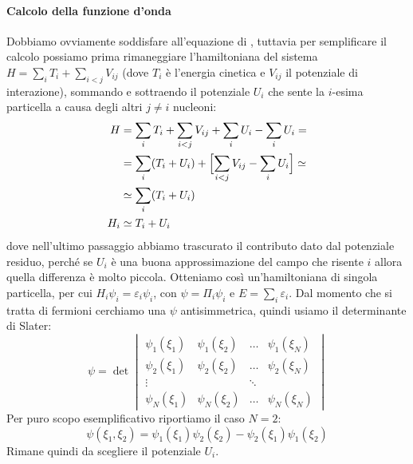 \paragraph{Calcolo della funzione d'onda} Dobbiamo ovviamente soddisfare all'equazione di \Sch, tuttavia per semplificare il calcolo possiamo prima rimaneggiare l'hamiltoniana del sistema $H=\sum_i T_i + \sum_{i<j}V_{ij}$ (dove $T_i$ è l'energia cinetica e $V_{ij}$ il potenziale di interazione), sommando e sottraendo il potenziale $U_i$ che sente la $i$-esima particella a causa degli altri $j\not =i$ nucleoni:
\begin{displaymath}
\begin{aligned}
H&=\sum_i T_i + \sum_{i<j}V_{ij} +\sum_i U_i - \sum_i U_i=\\
&= \sum_i (T_i + U_i) + \Bigl [ \sum_{i<j} V_{ij} - \sum_i U_i \Bigr ] \simeq\\
&\simeq \sum_i (T_i + U_i)\\
H_i &\simeq T_i + U_i
\end{aligned}
\end{displaymath}
dove nell'ultimo passaggio abbiamo trascurato il contributo dato dal potenziale residuo, perché se $U_i$ è una buona approssimazione del campo che risente $i$ allora quella differenza è molto piccola. Otteniamo così un'hamiltoniana di singola particella, per cui $H_i \psi_i = \varepsilon_i \psi_i$, con $\psi = \Pi_i \psi_i$ e $E = \sum_i \varepsilon_i$. Dal momento che si tratta di fermioni cerchiamo una $\psi$ antisimmetrica, quindi usiamo il determinante di Slater:
\begin{displaymath}
\psi = \det
\begin{vmatrix}
\psi_1 (\xi_1) & \psi_1 (\xi_2) & \dots & \psi_1 (\xi_N) \\
\psi_2 (\xi_1) & \psi_2 (\xi_2) & \dots & \psi_2 (\xi_N) \\
\vdots         &                & \ddots&                \\
\psi_N (\xi_1) & \psi_N (\xi_2) & \dots & \psi_N (\xi_N)
\end{vmatrix}
\end{displaymath}
Per puro scopo esemplificativo riportiamo il caso $N=2$:
$$\psi (\xi_1,\xi_2) = \psi_1 (\xi_1)\psi_2 (\xi_2) - \psi_2 (\xi_1)\psi_1 (\xi_2)$$
Rimane quindi da scegliere il potenziale $U_i$.
